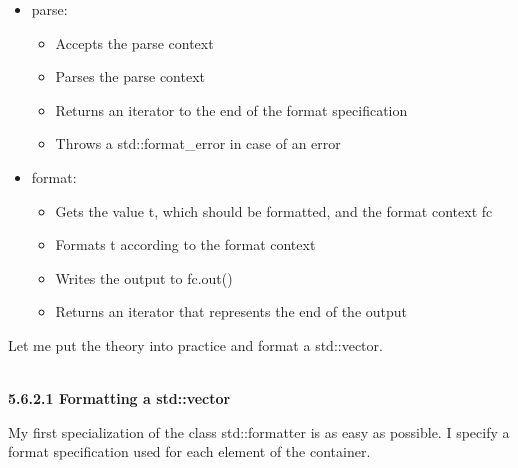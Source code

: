\begin{itemize}
\item 
parse:
\begin{itemize}
\item 
Accepts the parse context

\item 
Parses the parse context

\item 
Returns an iterator to the end of the format specification

\item 
Throws a std::format\_error in case of an error
\end{itemize}

\item 
format:
\begin{itemize}
\item 
Gets the value t, which should be formatted, and the format context fc

\item 
Formats t according to the format context

\item 
Writes the output to fc.out()

\item 
Returns an iterator that represents the end of the output
\end{itemize}
\end{itemize}

Let me put the theory into practice and format a std::vector.

\hspace*{\fill} \\ %
\noindent
\textbf{5.6.2.1\hspace{0.2cm} Formatting a std::vector}

My first specialization of the class std::formatter is as easy as possible. I specify a format specification used for each element of the container.

